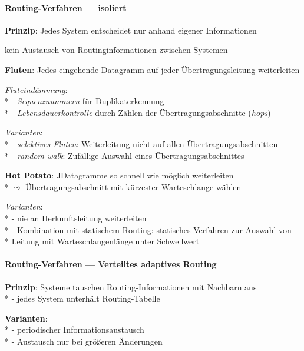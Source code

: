 \paragraph{Routing-Verfahren --- isoliert}
\begin{items}
  \item \textbf{Prinzip}: Jedes System entscheidet nur anhand eigener Informationen
   \item kein Austausch von Routinginformationen zwischen Systemen

    \medskip
  \item \textbf{Fluten}: Jedes eingehende Datagramm auf jeder Übertragungsleitung weiterleiten
  \item \emph{Fluteindämmung}: \\*
    - \emph{Sequenznummern} für Duplikaterkennung \\*
    - \emph{Lebensdauerkontrolle} durch Zählen der Übertragungsabschnitte (\emph{hops})
  \item \emph{Varianten}: \\*
    - \emph{selektives Fluten}: Weiterleitung nicht auf allen Übertragungsabschnitten \\*
    - \emph{random walk}: Zufällige Auswahl eines Übertragungsabschnittes

	\medskip
  \item \textbf{Hot Potato}: JDatagramme so schnell wie möglich weiterleiten \\*
    \( \leadsto \) Übertragungsabschnitt mit kürzester Warteschlange wählen
  \item \emph{Varianten}: \\*
    - nie an Herkunftsleitung weiterleiten \\*
    - Kombination mit statischem Routing: statisches Verfahren zur Auswahl von \\* \phantom{-} \phantom{\( \cdot \)} Leitung mit Warteschlangenlänge unter Schwellwert
\end{items}

\paragraph{Routing-Verfahren --- Verteiltes adaptives Routing}
\begin{items}
  \item \textbf{Prinzip}: Systeme tauschen Routing-Informationen mit Nachbarn aus \\*
    - jedes System unterhält Routing-Tabelle
  \item \textbf{Varianten}: \\*
    - periodischer Informationsaustausch \\*
    - Austausch nur bei größeren Änderungen
\end{items}

